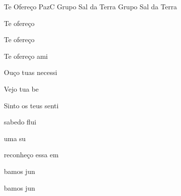 \documentclass[a4,12pt,oneside]{book}
\newcommand{\RevDate}{\today}
\newcommand{\NotCCLIed}{\relax}
\begin{document}
\begin{song}{Te Ofereço Paz}{C}
  {Grupo Sal da Terra}
  {Grupo Sal da Terra}
  {}
  {\NotCCLIed}
  
	\renewcommand{\RevDate}{28 de abril de 2015}
 
	
	\ifChordBk	
		\vspace{-2em}\flushright{\Cchord \quad \Cschord \quad \Fchord \quad \Emchord 
				\quad \Dmchord \quad \Gschord}
		\vspace{-1ex}
	\fi
	
	\begin{SBVerse*}
	
	Te ofereço 

	Te ofereço 

	Te ofereço ami

	Ouço tuas necessi

	Vejo tua be

	Sinto os teus senti

	 sabedo flui 

	 uma  su

	 reconheço essa  em 

	bamos jun 

	bamos jun 
	\end{SBVerse*}
\end{song}
\end{document}
